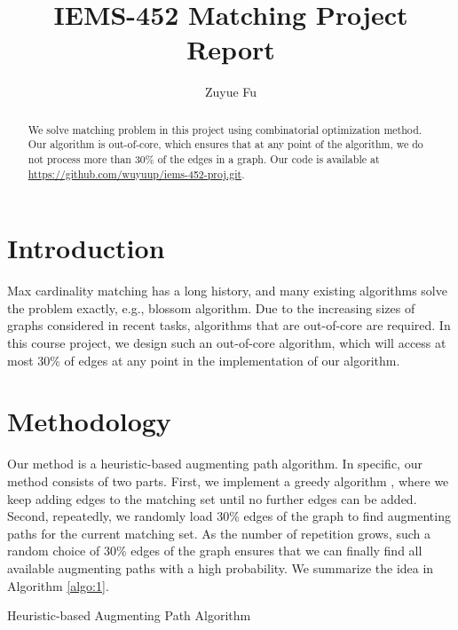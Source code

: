 \documentclass{article}
\title{IEMS-452 Matching Project Report}
\author{Zuyue Fu}
\begin{document}
\maketitle

\begin{abstract}
We solve matching problem in this project using combinatorial optimization method.   Our algorithm is  out-of-core, which ensures that  at any point of  the algorithm,  we do not process  more than 30\% of the edges in a graph.   Our code  is available  at \url{https://github.com/wuyuup/iems-452-proj.git}.  

\end{abstract}


\section{Introduction}

Max cardinality matching has a  long history, and  many existing algorithms  solve the  problem  exactly,  e.g.,  blossom algorithm.   Due to the increasing    sizes of graphs  considered in  recent  tasks,  algorithms that are out-of-core are  required.    In this course project,  we design  such an out-of-core algorithm,   which   will access at most 30\% of edges  at any  point  in the implementation of  our  algorithm.     


\section{Methodology}

Our method is  a heuristic-based augmenting path algorithm.  In specific,  our method consists of  two parts.   First,  we  implement a  greedy algorithm ,  where we  keep adding edges to the matching set until  no further  edges can be added.   Second,  repeatedly,  we   randomly  load 30\% edges  of  the graph  to find  augmenting paths  for the current matching set.   As the number of repetition  grows, such a  random  choice  of  30\% edges of the graph  ensures that   we  can finally   find   all   available   augmenting paths  with  a high probability.    We summarize the idea in Algorithm \ref{algo:1}. 

\begin{algorithm}
\caption{Heuristic-based Augmenting Path Algorithm}
\label{algo:1}
\begin{algorithmic}[1]
  \label{line:1}
  \label{line:2}
  \label{line:3}
\ENDFOR
\end{algorithmic}
\end{algorithm}
\end{document}
